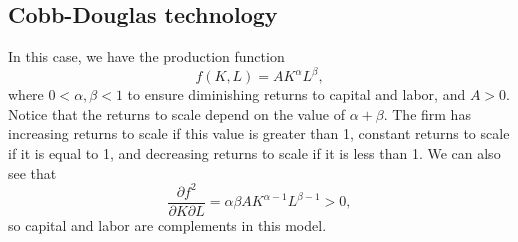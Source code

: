 \subsection*{Cobb-Douglas technology}

In this case, we have the production function
$$f(K, L) = AK^\alpha L^\beta,$$
where $0 < \alpha, \beta < 1$ to ensure diminishing returns to capital and labor, and $A > 0$. Notice that the returns to scale depend on the value of $\alpha + \beta$. The firm has increasing returns to scale if this value is greater than 1, constant returns to scale if it is equal to 1, and decreasing returns to scale if it is less than 1. We can also see that
$$\frac{\partial f^2}{\partial K \partial L} = \alpha \beta AK^{\alpha - 1} L^{\beta -1} > 0,$$
so capital and labor are complements in this model. 

